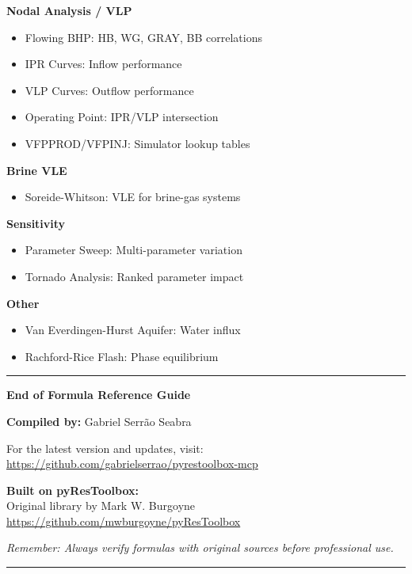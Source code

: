 \documentclass[11pt,a4paper]{article}
\begin{document}
\textbf{Nodal Analysis / VLP}
\begin{itemize}
\item Flowing BHP: HB, WG, GRAY, BB correlations
\item IPR Curves: Inflow performance
\item VLP Curves: Outflow performance
\item Operating Point: IPR/VLP intersection
\item VFPPROD/VFPINJ: Simulator lookup tables
\end{itemize}

\textbf{Brine VLE}
\begin{itemize}
\item Soreide-Whitson: VLE for brine-gas systems
\end{itemize}

\textbf{Sensitivity}
\begin{itemize}
\item Parameter Sweep: Multi-parameter variation
\item Tornado Analysis: Ranked parameter impact
\end{itemize}

\textbf{Other}
\begin{itemize}
\item Van Everdingen-Hurst Aquifer: Water influx
\item Rachford-Rice Flash: Phase equilibrium
\end{itemize}

\vspace{2cm}

\begin{center}
\rule{\linewidth}{0.5pt}
\vspace{0.5cm}

\Large\textbf{End of Formula Reference Guide}

\vspace{0.5cm}

\textbf{Compiled by:} Gabriel Serrão Seabra

\vspace{0.5cm}

For the latest version and updates, visit:\\
\url{https://github.com/gabrielserrao/pyrestoolbox-mcp}

\vspace{0.5cm}

\textbf{Built on pyResToolbox:}\\
Original library by Mark W. Burgoyne\\
\url{https://github.com/mwburgoyne/pyResToolbox}

\vspace{0.5cm}

\textit{Remember: Always verify formulas with original sources before professional use.}

\vspace{0.5cm}
\rule{\linewidth}{0.5pt}
\end{center}
\end{document}
